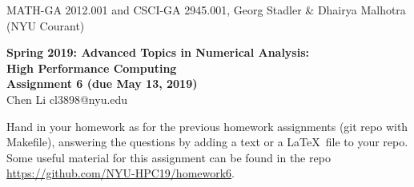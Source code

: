 \documentclass[12pt]{article}
\begin{document}
\begin{center}
  \vspace*{-2cm}
{\small MATH-GA 2012.001 and CSCI-GA 2945.001, Georg Stadler \&
  Dhairya Malhotra (NYU Courant)}
\end{center}
\vspace*{.5cm}
\begin{center}
\large \textbf{%
Spring 2019: Advanced Topics in Numerical Analysis: \\
High Performance Computing \\
Assignment 6 (due May 13, 2019) \\ }
Chen Li cl3898@nyu.edu
\end{center}

 Hand in your homework as for
the previous homework assignments (git repo with Makefile), answering
the questions by adding a text or a \LaTeX\ file to your repo. Some
useful material for this assignment can be found in the repo \url{https://github.com/NYU-HPC19/homework6}.
\\[.2ex]
\end{document}
